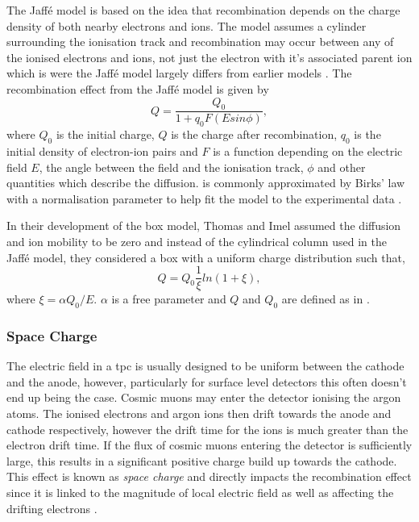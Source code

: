 The Jaff\'{e} model is based on the idea that recombination depends on the charge density of both nearby electrons and ions. The model assumes a cylinder surrounding the ionisation track and recombination may occur between any of the ionised electrons and ions, not just the electron with it's associated parent ion which is were the Jaff\'{e} model largely differs from earlier models \cite{Jaffe_model}. The recombination effect from the Jaff\'{e} model is given by 
\begin{equation}\label{Jaffe}
    Q = \frac{Q_{0}}{1+q_{0}F(Esin\phi)},
\end{equation}
where $Q_0$ is the initial charge, $Q$ is the charge after recombination, $q_0$ is the initial density of electron-ion pairs and $F$ is a function depending on the electric field $E$, the angle between the field and the ionisation track, $\phi$ and other quantities which describe the diffusion.  is commonly approximated by Birks' law with a normalisation parameter to help fit the model to the experimental data \cite{LArTPC_book}. 

In their development of the box model, Thomas and Imel assumed the diffusion and ion mobility to be zero and instead of the cylindrical column used in the Jaff\'{e} model, they considered a box with a uniform charge distribution such that, 
\begin{equation}
    Q = Q_{0}\frac{1}{\xi}ln(1+\xi),
\end{equation}
where $\xi = \alpha Q_0/E$. $\alpha$ is a free parameter and $Q$ and $Q_0$ are defined as in \cite{LArTPC_book}\cite{Recombination_box_model}.


\subsubsection{Space Charge}
The electric field in a \gls{tpc} is usually designed to be uniform between the cathode and the anode, however, particularly for surface level detectors this often doesn't end up being the case. Cosmic muons may enter the detector ionising the argon atoms. The ionised electrons and argon ions then drift towards the anode and cathode respectively, however the drift time for the ions is much greater than the electron drift time. If the flux of cosmic muons entering the detector is sufficiently large, this results in a significant positive charge build up towards the cathode. This effect is known as \textit{space charge} and directly impacts the recombination effect since it is linked to the magnitude of local electric field as well as affecting the drifting electrons \cite{microboone_sce}.

